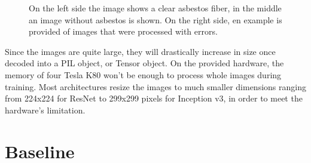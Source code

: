 \begin{figure}[t]
\centering
\caption{On the left side the image shows a clear asbestos fiber, in the middle an image without asbestos is shown. On the right side, en example is provided of images that were processed with errors.}
\label{fig:basic_examples}
\end{figure}

\newpage

Since the images are quite large, they will drastically increase in size once decoded into a PIL object, or Tensor object. On the provided hardware, the memory of four Tesla K80 won't be enough to process whole images during training. Most architectures resize the images to much smaller dimensions ranging from 224x224 for ResNet to 299x299 pixels for Inception v3, in order to meet the hardware's  limitation.

\section{Baseline}

